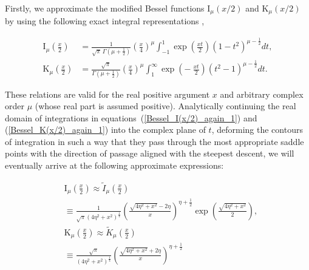 \documentclass[draft]{agujournal2019}
\begin{document}
{Firstly, we approximate the modified Bessel functions $\mathrm{I}_{\mu}(x/2)$
and $\mathrm{K}_{\mu}(x/2)$ by using the following exact integral
representations \cite{Bateman_Erdelyi:Higher3,Arfken:Mathematical},
\begin{linenomath*}
\begin{subequations}
\label{Bessel_I,K(x/2)_again_1}%
\begin{align}
\mathrm{I}_{\mu}\left(  \frac{x}{2}\right)   &  =\frac{1}{\sqrt{\pi}\,
\Gamma\left(  \mu+\frac{1}{2}\right)  }\left(  \frac{x}{4}\right)  ^{\mu}%
\int_{-1}^{1}\exp\left(  \frac{xt}{2}\right)  \left(  1-t^{2}\right)
^{\mu-\frac{1}{2}}dt,\label{Bessel_I(x/2)_again_1}\\
\mathrm{K}_{\mu}\left(  \frac{x}{2}\right)   &  =\frac{\sqrt{\pi}}%
{\Gamma\left(  \mu+\frac{1}{2}\right)  }\left(  \frac{x}{4}\right)  ^{\mu}%
\int_{1}^{\infty}\exp\left(  -\ \frac{xt}{2}\right)  \left(  t^{2}-1\right)
^{\mu-\frac{1}{2}}dt. 
\label{Bessel_K(x/2)_again_1}
\end{align}
\end{subequations}
\end{linenomath*}
These relations are valid for the real positive argument $x$ and arbitrary
complex order $\mu$ (whose real part is assumed positive). Analytically
continuing the real domain of integrations in
equations~(\ref{Bessel_I(x/2)_again_1}) and (\ref{Bessel_K(x/2)_again_1}) into
the complex plane of $t$, deforming the contours of integration in such a way
that they pass through the most appropriate saddle points with the direction
of passage aligned with the steepest descent, we will eventually arrive at the
following approximate expressions:
\begin{linenomath*}
\begin{subequations}
\label{Bessel_I,K_appoximate}
\begin{align}
&  \mathrm{I}_{\mu}\left(  \frac{x}{2}\right)  \approx\tilde{I}_{\mu}\left(
\frac{x}{2}\right) \nonumber\\
&  \equiv\frac{1}{\sqrt{\pi}\left(  4\eta^{2}+x^{2}\right)  ^{\frac{1}{4}}%
}\left(  \frac{\sqrt{4\eta^{2}+x^{2}}-2\eta}{x}\right)  ^{\eta+\frac{1}{2}%
}\exp\left(  \frac{\sqrt{4\eta^{2}+x^{2}}}{2}\right)
,\label{Bessel_I_appoximate}\\
&  \mathrm{K}_{\mu}\left(  \frac{x}{2}\right)  \approx\tilde{K}_{\mu}\left(
\frac{x}{2}\right) \nonumber\\
&  \equiv\frac{\sqrt{\pi}}{\left(  4\eta^{2}+x^{2}\right)  ^{\frac{1}{4}}%
}\left(  \frac{\sqrt{4\eta^{2}+x^{2}}+2\eta}{x}\right)  ^{\eta+\frac{1}{2}%
}
\end{align}
\end{subequations}
\end{linenomath*}}
\end{document}
